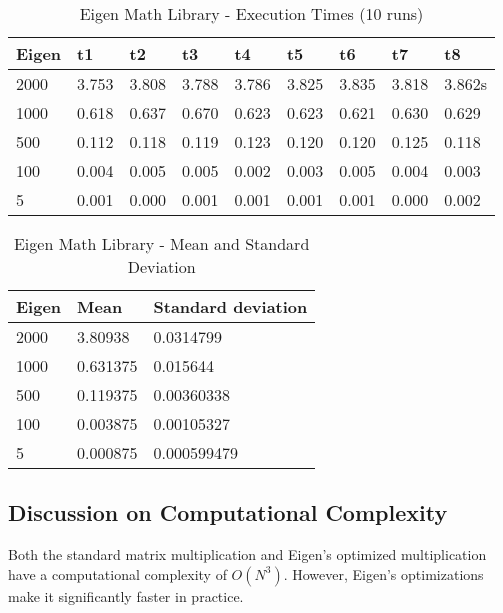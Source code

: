\documentclass{article}
\begin{document}
\begin{table}[h]
\centering
\caption{Eigen Math Library - Execution Times (10 runs)}
\begin{tabular}{|l|l|l|l|l|l|l|l|l|}
\hline
\rowcolor[HTML]{C0C0C0} 
\cellcolor[HTML]{DAE8FC}Eigen & t1    & t2    & t3    & t4    & t5    & t6    & t7    & t8     \\ \hline
\cellcolor[HTML]{EFEFEF}2000  & 3.753 & 3.808 & 3.788 & 3.786 & 3.825 & 3.835 & 3.818 & 3.862s \\ \hline
\cellcolor[HTML]{EFEFEF}1000  & 0.618 & 0.637 & 0.670 & 0.623 & 0.623 & 0.621 & 0.630 & 0.629  \\ \hline
\cellcolor[HTML]{EFEFEF}500   & 0.112 & 0.118 & 0.119 & 0.123 & 0.120 & 0.120 & 0.125 & 0.118  \\ \hline
\cellcolor[HTML]{EFEFEF}100   & 0.004 & 0.005 & 0.005 & 0.002 & 0.003 & 0.005 & 0.004 & 0.003  \\ \hline
\cellcolor[HTML]{EFEFEF}5     & 0.001 & 0.000 & 0.001 & 0.001 & 0.001 & 0.001 & 0.000 & 0.002  \\ \hline
\end{tabular}
\end{table}

\begin{table}[h]
\centering
\caption{Eigen Math Library - Mean and Standard Deviation}
\begin{tabular}{|
>{\columncolor[HTML]{EFEFEF}}l |l|l|}
\hline
\cellcolor[HTML]{DAE8FC}Eigen & \cellcolor[HTML]{C0C0C0}Mean & \cellcolor[HTML]{C0C0C0}Standard deviation \\ \hline
2000                          & 3.80938                      & 0.0314799                                  \\ \hline
1000                          & 0.631375                     & 0.015644                                   \\ \hline
500                           & 0.119375                     & 0.00360338                                 \\ \hline
100                           & 0.003875                     & 0.00105327                                 \\ \hline
5                             & 0.000875                     & 0.000599479                                \\ \hline
\end{tabular}
\end{table}

\subsection{Discussion on Computational Complexity}
Both the standard matrix multiplication and Eigen's optimized multiplication have a computational complexity of \(O(N^3)\). However, Eigen's optimizations make it significantly faster in practice.
\end{document}
